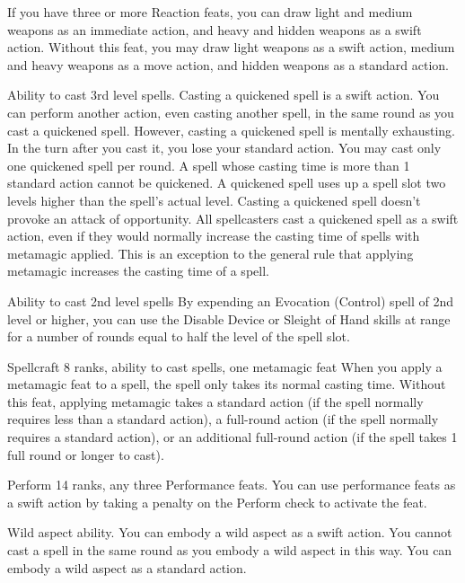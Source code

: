 If you have three or more Reaction feats, you can draw light and medium weapons as an immediate action, and heavy and hidden weapons as a swift action.
 Without this feat, you may draw light weapons as a swift action, medium and heavy weapons as a move action, and hidden weapons as a standard action.

\label{Quicken Spell}
 Ability to cast 3rd level spells.
 Casting a quickened spell is a swift action. You can perform another action, even casting another spell, in the same round as you cast a quickened spell. However, casting a quickened spell is mentally exhausting. In the turn after you cast it, you lose your standard action. You may cast only one quickened spell per round. A spell whose casting time is more than 1 standard action cannot be quickened. A quickened spell uses up a spell slot two levels higher than the spell's actual level. Casting a quickened spell doesn't provoke an attack of opportunity.
 All spellcasters cast a quickened spell as a swift action, even if they would normally increase the casting time of spells with metamagic applied. This is an exception to the general rule that applying metamagic increases the casting time of a spell.

 Ability to cast 2nd level spells
 By expending an Evocation (Control) spell of 2nd level or higher, you can use the Disable Device or Sleight of Hand skills at \rngclose range for a number of rounds equal to half the level of the spell slot.

 Spellcraft 8 ranks, ability to cast spells, one metamagic feat
 When you apply a metamagic feat to a spell, the spell only takes its normal casting time.
 Without this feat, applying metamagic takes a standard action (if the spell normally requires less than a standard action), a full-round action (if the spell normally requires a standard action), or an additional full-round action (if the spell takes 1 full round or longer to cast).

\featpre Perform 14 ranks, any three Performance feats.
\featben You can use performance feats as a swift action by taking a  penalty on the Perform check to activate the feat.

\featpre Wild aspect ability.
\featben You can embody a wild aspect as a swift action. You cannot cast a spell in the same round as you embody a wild aspect in this way.
 You can embody a wild aspect as a standard action.

